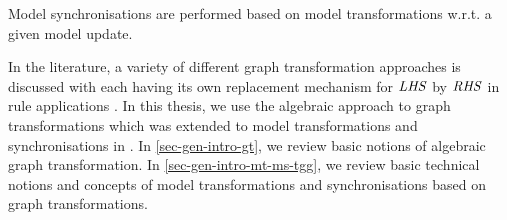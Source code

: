 Model synchronisations are performed based on model transformations w.r.t. a given model update.

In the literature, a variety of different graph transformation approaches is discussed with each having its own replacement mechanism for $\mathit{LHS}$ by $\mathit{RHS}$ in rule applications \cite{Rozenberg:1997:HGG:278918,Ehrig:1999:HGG:328523,graphgrammarhandbook99}. 
In this thesis, we use the algebraic approach to graph transformations \cite{Ehrig:2006:FAG:1121741} which was extended to model transformations and synchronisations in \cite{FAGT2}.
In \cref{sec-gen-intro-gt}, we review basic notions of algebraic graph transformation.
In \cref{sec-gen-intro-mt-ms-tgg}, we review basic technical notions and concepts of model transformations and synchronisations based on graph transformations.